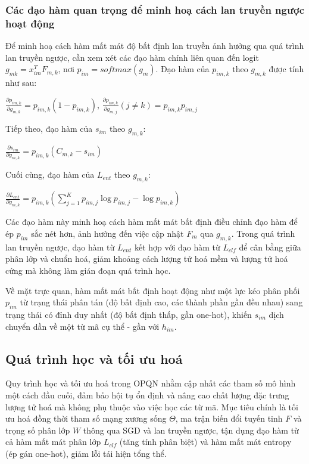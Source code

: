 \subsubsection{ Các đạo hàm quan trọng để minh hoạ cách lan truyền ngược hoạt động}
Để minh hoạ cách hàm mất mát độ bất định lan truyền ảnh hưởng qua quá trình lan truyền ngược, cần xem xét các đạo hàm chính liên quan đến logit $g_{mk} = x^T_{im} F_{m,k}$, nơi $p_{im} =  softmax(g_m)$. Đạo hàm của $p_{im,k}$ theo $g_{m,k}$ được tính như sau:

$\frac{\partial p_{im,k}}{\partial g_{m,k}} = p_{im,k} (1 - p_{im,k})$, $\frac{\partial p_{im,k}}{\partial g_{m,j}} (j \neq k) =  p_{im,k}p_{im,j}$

Tiếp theo, đạo hàm của $s_{im}$ theo $g_{m,k}$:

$\frac{\partial s_{im}}{\partial g_{m,k}} = p_{im,k}(C_{m,k} - s_{im})$

Cuối cùng, đạo hàm của $L_{ent}$ theo $g_{m,k}$:

$\frac{\partial L_{ent}}{\partial g_{m,k}} = p_{im,k} (\sum_{j=1}^K p_{im,j} \log p_{im,j} - \log p_{im,k})$

Các đạo hàm này minh hoạ cách hàm mất mát bất định điều chỉnh đạo hàm để ép $p_{im}$ sắc nét hơn, ảnh hưởng đến việc cập nhật $F_m$ qua $g_{m,k}$. Trong quá trình lan truyền ngược, đạo hàm từ $L_{ent}$ kết hợp với đạo hàm từ $L_{clf}$ để cân bằng giữa phân lớp và chuẩn hoá, giảm khoảng cách lượng tử hoá mềm và lượng tử hoá cứng mà không làm gián đoạn quá trình học.

Về mặt trực quan, hàm mất mát bất định hoạt động như một lực kéo phân phối $p_{im}$ từ trạng thái phân tán (độ bất định cao, các thành phần gần đều nhau) sang trạng thái có đỉnh duy nhất (độ bất định thấp, gần one-hot), khiến $s_{im}$ dịch chuyển dần về một từ mã cụ thể - gần với $h_{im}$. 

\subsection{Quá trình học và tối ưu hoá}
Quy trình học và tối ưu hoá trong OPQN nhằm cập nhất các tham số mô hình một cách đầu cuối, đảm bảo hội tụ ổn định và nâng cao chất lượng đặc trưng lượng tử hoá mà không phụ thuộc vào việc học các từ mã. Mục tiêu chính là tối ưu hoá đồng thời tham số mạng xương sống $\Theta$, ma trận biến đổi tuyến tinh $F$ và trọng số phân lớp $W$ thông qua SGD và lan truyền ngược, tận dụng đạo hàm từ cả hàm mất mát phân lớp $L_{clf}$ (tăng tính phân biệt) và hàm mất mát entropy (ép gán one-hot), giảm lỗi tái hiện tổng thể. 

